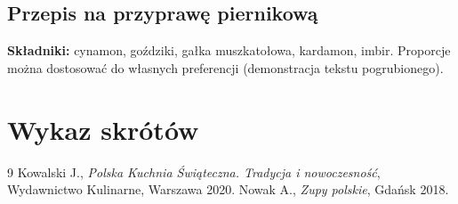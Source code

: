 \documentclass[11pt,a4paper]{report}
\begin{document}
	\section{Przepis na przyprawę piernikową}
	\textbf{Składniki:} cynamon, goździki, gałka muszkatołowa, kardamon, imbir. Proporcje można dostosować do własnych preferencji (demonstracja tekstu pogrubionego).
	
	
	\chapter{Wykaz skrótów}
	\begin{acronym}[KGW]
	\end{acronym}
	
	
	\begin{thebibliography}{9}
		 Kowalski J., \emph{Polska Kuchnia Świąteczna. Tradycja i nowoczesność}, Wydawnictwo Kulinarne, Warszawa 2020.
		 Nowak A., \emph{Zupy polskie}, Gdańsk 2018.
	\end{thebibliography}
	
	\printindex
	
\end{document}
